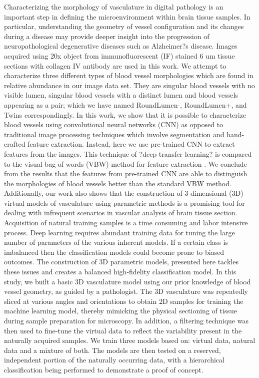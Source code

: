 Characterizing the morphology of vasculature in digital pathology is an important step in defining the microenvironment within brain tissue samples. In particular, understanding the geometry of vessel configuration and its changes during a disease may provide deeper insight into the progression of neuropathological degenerative diseases such as Alzheimer?s disease. Images acquired using 20x object from immunofluorescent (IF) stained 6 um tissue sections with collagen IV antibody are used in this work.  We attempt to characterize three different types of blood vessel morphologies which are found in relative abundance in our image data set. They are singular blood vessels with no visible lumen, singular blood vessels with a distinct lumen and blood vessels appearing as a pair; which we have named RoundLumen-, RoundLumen+, and Twins correspondingly.
In this work, we show that it is possible to characterize blood vessels using convolutional neural networks (CNN) as opposed to traditional image processing techniques which involve segmentation and hand-crafted feature extraction. Instead, here we use pre-trained CNN to extract features from the images. This technique of ?deep transfer learning? is compared to the visual bag of words (VBW) method for feature extraction \cite{yang2007evaluating}. We conclude from the results that the features from pre-trained CNN are able to distinguish the morphologies of blood vessels better than the standard VBW method. 
Additionally, our work also shows that the construction of 3 dimensional (3D) virtual models of vasculature using parametric methods is a promising tool for dealing with infrequent scenarios in vascular analysis of brain tissue section. Acquisition of natural training samples is a time consuming and labor intensive process. Deep learning requires abundant training data for tuning the large number of parameters of the various inherent models. If a certain class is imbalanced then the classification models could become prone to biased outcomes. The construction of 3D parametric models, presented here tackles these issues and creates a balanced high-fidelity classification model. 
In this study, we built a basic 3D vasculature model using our prior knowledge of blood vessel geometry, as guided by a pathologist. The 3D vasculature was repeatedly sliced at various angles and orientations to obtain 2D samples for training the machine learning model, thereby mimicking the physical sectioning of tissue during sample preparation for microscopy. In addition, a filtering technique was then used to fine-tune the virtual data to reflect the variability present in the naturally acquired samples. We train three models based on: virtual data, natural data and a mixture of both. The models are then tested on a reserved, independent portion of the naturally occurring data, with a hierarchical classification being performed to demonstrate a proof of concept. 
